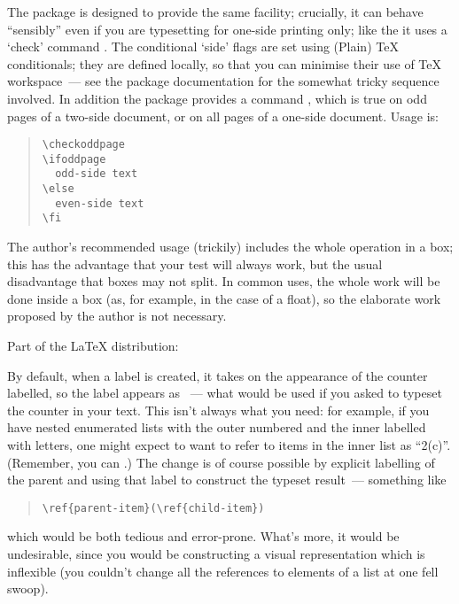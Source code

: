 The package  is designed to provide the same
facility; crucially, it can behave ``sensibly'' even if you are
typesetting for one-side printing only; like the 
it uses a `check' command .  The conditional `side'
flags are set using (Plain) \TeX{} conditionals; they are defined
locally, so that you can minimise their use of \TeX{} workspace~---
see the package documentation for the somewhat tricky sequence
involved.  In addition the package provides a command
, which is true on odd pages of a two-side
document, or on all pages of a one-side document.  Usage is:
\begin{quote}
\begin{verbatim}
\checkoddpage
\ifoddpage
  odd-side text
\else
  even-side text
\fi
\end{verbatim}
\end{quote}
The author's recommended usage (trickily) includes the whole operation
in a box; this has the advantage that your test will always work, but
the usual disadvantage that boxes may not split.  In common uses, the
whole work will be done inside a box (as, for example, in the case of
a float), so the elaborate work proposed by the author is not
necessary.
\begin{ctanrefs}
\item[changepage.sty]
\item[ifoddpage.sty]
\item[ifthen.sty]Part of the \LaTeX{} distribution: 
\item[\nothtml{\rmfamily}KOMA script bundle]
\item[memoir.cls]
\end{ctanrefs}


By default, when a label is created, it takes on the appearance of the
counter labelled, so the label appears as
\texttt{}~--- what would be used if you
asked to typeset the counter in your text.  This isn't always what you
need: for example, if you have nested enumerated lists with the outer
numbered and the inner labelled with letters, one might expect to want
to refer to items in the inner list as ``2(c)''.   (Remember, you can
%
.)
The change is of course
possible by explicit labelling of the parent and using that label to
construct the typeset result~--- something like
\begin{quote}
\begin{verbatim}
\ref{parent-item}(\ref{child-item})
\end{verbatim}
\end{quote}
which would be both tedious and error-prone.  What's more, it would be
undesirable, since you would be constructing a visual representation
which is inflexible (you couldn't change all the references to elements
of a list at one fell swoop).

